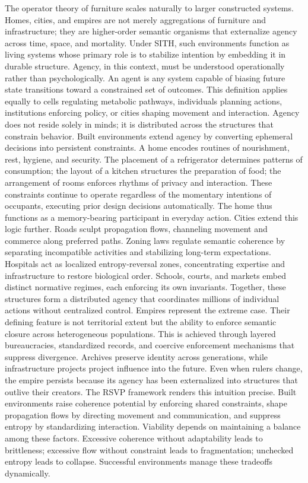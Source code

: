 \documentclass[11pt,oneside]{article}
\begin{document}
The operator theory of furniture scales naturally to larger constructed systems. Homes, cities, and empires are not merely aggregations of furniture and infrastructure; they are higher-order semantic organisms that externalize agency across time, space, and mortality. Under SITH, such environments function as living systems whose primary role is to stabilize intention by embedding it in durable structure.
Agency, in this context, must be understood operationally rather than psychologically. An agent is any system capable of biasing future state transitions toward a constrained set of outcomes. This definition applies equally to cells regulating metabolic pathways, individuals planning actions, institutions enforcing policy, or cities shaping movement and interaction. Agency does not reside solely in minds; it is distributed across the structures that constrain behavior.
Built environments extend agency by converting ephemeral decisions into persistent constraints. A home encodes routines of nourishment, rest, hygiene, and security. The placement of a refrigerator determines patterns of consumption; the layout of a kitchen structures the preparation of food; the arrangement of rooms enforces rhythms of privacy and interaction. These constraints continue to operate regardless of the momentary intentions of occupants, executing prior design decisions automatically. The home thus functions as a memory-bearing participant in everyday action.
Cities extend this logic further. Roads sculpt propagation flows, channeling movement and commerce along preferred paths. Zoning laws regulate semantic coherence by separating incompatible activities and stabilizing long-term expectations. Hospitals act as localized entropy-reversal zones, concentrating expertise and infrastructure to restore biological order. Schools, courts, and markets embed distinct normative regimes, each enforcing its own invariants. Together, these structures form a distributed agency that coordinates millions of individual actions without centralized control.
Empires represent the extreme case. Their defining feature is not territorial extent but the ability to enforce semantic closure across heterogeneous populations. This is achieved through layered bureaucracies, standardized records, and coercive enforcement mechanisms that suppress divergence. Archives preserve identity across generations, while infrastructure projects project influence into the future. Even when rulers change, the empire persists because its agency has been externalized into structures that outlive their creators.
The RSVP framework renders this intuition precise. Built environments raise coherence potential by enforcing shared constraints, shape propagation flows by directing movement and communication, and suppress entropy by standardizing interaction. Viability depends on maintaining a balance among these factors. Excessive coherence without adaptability leads to brittleness; excessive flow without constraint leads to fragmentation; unchecked entropy leads to collapse. Successful environments manage these tradeoffs dynamically.
\end{document}
